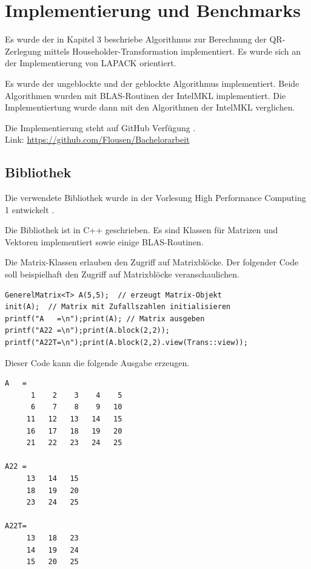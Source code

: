 \chapter{Implementierung und Benchmarks}
Es wurde der in Kapitel 3 beschriebe Algorithmus zur Berechnung der QR-Zerlegung mittels Householder-Transformation implementiert. Es wurde sich an der Implementierung von LAPACK orientiert.

Es wurde der ungeblockte und der geblockte Algorithmus implementiert. Beide Algorithmen wurden mit BLAS-Routinen der IntelMKL implementiert. Die Implementiertung wurde dann mit den Algorithmen der IntelMKL verglichen.

Die Implementierung steht auf GitHub Verfügung \cite{git}.\\
Link: \url{https://github.com/Flousen/Bachelorarbeit}

\section{Bibliothek}
Die verwendete Bibliothek wurde in der Vorlesung High Performance Computing 1 entwickelt \cite{HPC1}.

Die Bibliothek ist in C++ geschrieben. Es sind Klassen für Matrizen und Vektoren implementiert sowie einige BLAS-Routinen.

Die Matrix-Klassen erlauben den Zugriff auf Matrixblöcke. 
Der folgender Code soll beispielhaft den Zugriff auf Matrixblöcke veranschaulichen.
\begin{lstlisting}
GenerelMatrix<T> A(5,5);  // erzeugt Matrix-Objekt
init(A);  // Matrix mit Zufallszahlen initialisieren
printf("A   =\n");print(A); // Matrix ausgeben
printf("A22 =\n");print(A.block(2,2));
printf("A22T=\n");print(A.block(2,2).view(Trans::view));
\end{lstlisting}

Dieser Code kann die folgende Ausgabe erzeugen. \newpage
\lstset{numbers=none}
\begin{lstlisting} 
A   = 
      1    2    3    4    5
      6    7    8    9   10
     11   12   13   14   15
     16   17   18   19   20
     21   22   23   24   25

A22 = 
     13   14   15
     18   19   20
     23   24   25

A22T= 
     13   18   23
     14   19   24
     15   20   25
\end{lstlisting}

